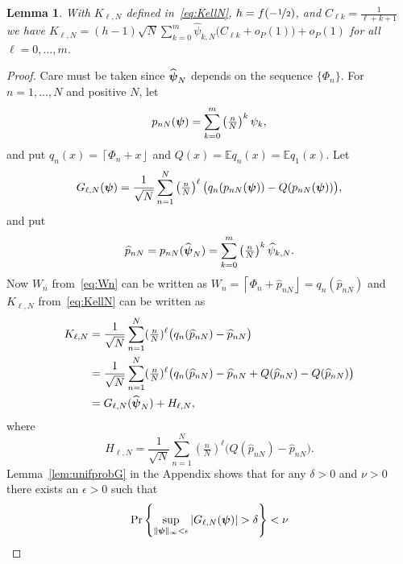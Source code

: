 \documentclass[aap,preprint]{imsart}
\newcommand{\prob}{\operatorname{Pr}}
\newcommand{\expect}{{\mathbb E}}
\newcommand{\abs}[1]{\left\vert #1 \right\vert}
\newcommand{\round}[1]{{\left\lceil #1 \right\rfloor}}
\newtheorem{lemma}{Lemma}
\begin{document}
\begin{lemma}\label{lem:Kconvfhalf}
With $K_{\ell,N}$ defined in~\eqref{eq:KellN}, $h = f(-\nicefrac{1}{2})$, and $C_{\ell k} =  \frac{1}{\ell + k + 1}$ we have $K_{\ell,N} = (h - 1) \sqrt{N} \sum_{k=0}^{m}  \widehat{\psi}_{k,N} \big( C_{\ell k} + o_P(1) \big) + o_P(1)$ for all $\ell = 0, \dots, m$.%
\end{lemma}
\begin{proof}
Care must be taken since $\widehat{\boldsymbol{\psi}}_N$ depends on the sequence $\{ \Phi_n \}$.  For $n = 1, \dots, N$ and positive $N$, let
\begin{equation}
p_{nN}(\psibf) = \sum_{k=0}^{m}\left( \tfrac{n}{N}\right)^k \psi_k,
\end{equation}
and put $q_{n}(x) = \round{\Phi_n + x}$ and $Q(x) = \expect q_{n}(x) =  \expect q_{1}(x)$.  Let
\begin{equation}\label{eq:GNdef}
G_{\ell,N}(\psibf) = \frac{1}{\sqrt{N}} \sum_{n=1}^{N}\left( \tfrac{n}{N}\right)^\ell  \big(q_n(p_{nN}(\psibf)) - Q(p_{nN}(\psibf)) \big),
\end{equation}
and put
\begin{equation}\label{eq:hatpnN}
\widehat{p}_{nN} = p_{nN}(\widehat{\psibf}_N) = \sum_{k=0}^m \left(\tfrac{n}{N}\right)^k \widehat{\psi}_{k,N}.
\end{equation}
Now $W_n$ from~\eqref{eq:Wn} can be written as $W_n = \round{\Phi_n + \widehat{p}_{nN}} = q_{n}(\widehat{p}_{nN})$ and $K_{\ell,N}$ from~\eqref{eq:KellN} can be written as
\begin{align*}
K_{\ell,N} &= \frac{1}{\sqrt{N}}\sum_{n=1}^{N}(\tfrac{n}{N})^\ell\big( q_{n}(\widehat{p}_{nN}) - \widehat{p}_{nN}  \big) \\
&= \frac{1}{\sqrt{N}}\sum_{n=1}^{N}(\tfrac{n}{N})^\ell\big(q_{n}(\widehat{p}_{nN}) - \widehat{p}_{nN} + Q(\widehat{p}_{nN}) - Q(\widehat{p}_{nN}) \big) \\
&= G_{\ell,N}(\widehat{\psibf}_N) + H_{\ell,N},
\end{align*}
where 
\begin{equation}\label{eq:HellNdef}
H_{\ell,N} = \frac{1}{\sqrt{N}}\sum_{n=1}^{N}(\tfrac{n}{N})^\ell \big( Q(\widehat{p}_{nN}) - \widehat{p}_{nN} \big).
\end{equation}
Lemma~\ref{lem:unifprobG} in the Appendix shows that for any $\delta >0$ and $\nu > 0$ there exists an $\epsilon > 0$ such that
\[
\prob\left\{ \sup_{\|\psibf\|_{\infty} < \epsilon} \abs{ G_{\ell,N}(\psibf) } > \delta   \right\} < \nu
\]
\end{proof}
\end{document}
